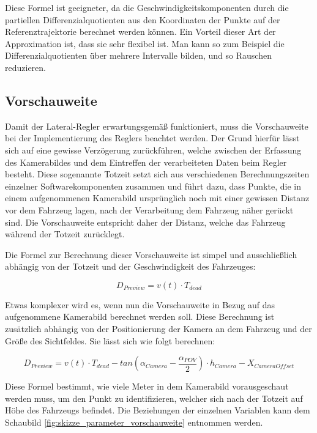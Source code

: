 Diese Formel ist geeigneter, da die Geschwindigkeitskomponenten durch die partiellen Differenzialquotienten aus den Koordinaten der Punkte auf der Referenztrajektorie berechnet werden können.
Ein Vorteil dieser Art der Approximation ist, dass sie sehr flexibel ist.
Man kann so zum Beispiel die Differenzialquotienten über mehrere Intervalle bilden, und so Rauschen reduzieren.

\subsection{Vorschauweite}

Damit der Lateral-Regler erwartungsgemäß funktioniert, muss die Vorschauweite bei der Implementierung des Reglers beachtet werden. Der Grund hierfür lässt sich auf eine gewisse Verzögerung zurückführen, welche zwischen der Erfassung des Kamerabildes und dem Eintreffen der verarbeiteten Daten beim Regler besteht. Diese sogenannte Totzeit setzt sich aus verschiedenen Berechnungszeiten einzelner Softwarekomponenten zusammen und führt dazu, dass Punkte, die in einem aufgenommenen Kamerabild ursprünglich noch mit einer gewissen Distanz vor dem Fahrzeug lagen, nach der Verarbeitung dem Fahrzeug näher gerückt sind. Die Vorschauweite entspricht daher der Distanz, welche das Fahrzeug während der Totzeit zurücklegt.

Die Formel zur Berechnung dieser Vorschauweite ist simpel und ausschließlich abhängig von der Totzeit und der Geschwindigkeit des Fahrzeuges:

\begin{equation}
\label{vorschauweite_simpel}
D_{Preview} = v(t) \cdot T_{dead}
\end{equation}

Etwas komplexer wird es, wenn nun die Vorschauweite in Bezug auf das aufgenommene Kamerabild berechnet werden soll. Diese Berechnung ist zusätzlich abhängig von der Positionierung der Kamera an dem Fahrzeug und der Größe des Sichtfeldes. Sie lässt sich wie folgt berechnen:

\begin{equation}
\label{vorschauweite_kamerabild}
D_{Preview} = v(t) \cdot T_{dead} - tan(\alpha_{Camera} - \frac{\alpha_{POV}}{2}) \cdot h_{Camera} - X_{CameraOffset}
\end{equation}

Diese Formel bestimmt, wie viele Meter in dem Kamerabild vorausgeschaut werden muss, um den Punkt zu identifizieren, welcher sich nach der Totzeit auf Höhe des Fahrzeugs befindet. Die Beziehungen der einzelnen Variablen kann dem Schaubild \ref{fig:skizze_parameter_vorschauweite} entnommen werden.


